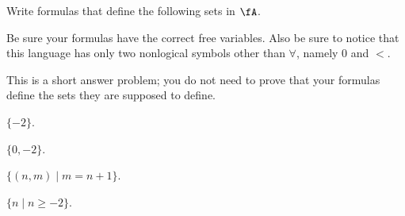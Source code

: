 \begin{problem}
  Write formulas that define the following sets in $\fA$.  

  \step
  Be sure your formulas have the correct free variables.
  Also be sure to notice that this language has only two
  nonlogical symbols other than $\forall$, namely $0$ and $<$.
  
  \step
  This is a short answer problem; you do not need to prove
  that your formulas define the sets they are supposed to define.

  \begin{enumalph}
    \item $\{-2\}$.
      \begin{Answer}

      \end{Answer}
    \item $\{0 , -2 \}$.
      \begin{Answer}

      \end{Answer}
    \item $\{ (n,m) \mid m = n +  1\}$.
      \begin{Answer}

      \end{Answer}
    \item $\{n \mid n \geq -2\}$.
      \begin{Answer}

      \end{Answer}
  \end{enumalph}
\end{problem}
